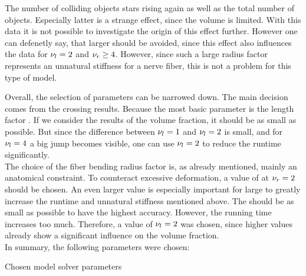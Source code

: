 The number of colliding objects stars rising again as well as the total number of objects.
Especially latter is a strange effect, since the volume is limited.
With this data it is not possible to investigate the origin of this effect further.
However one can defenetly say, that larger \segRadiusFactor{} should be avoided, since this effect also influences the data for $\textnormal{$\nu_{l}$} = 2$ and $\textnormal{$\nu_{r}$} \geq 4$.
However, since such a large radius factor represents an unnatural stiffness for a nerve fiber, this is not a problem for this type of model.
\par
% 
Overall, the selection of parameters can be narrowed down.
The main decision comes from the crossing results.
Because the most basic parameter is the length factor \segLengthFactor{}.
If we consider the results of the volume fraction, it should be as small as possible.
But since the difference between $\textnormal{$\nu_{l}$}=\SI{1}{}$ and $\textnormal{$\nu_{l}$}=\SI{2}{}$ is small, and for $\textnormal{$\nu_{l}$}=\SI{4}{}$ a big jump becomes visible, one can use $\textnormal{$\nu_{l}$}=\SI{2}{}$ to reduce the runtime significantly.
\\
% 
The choice of the fiber bending radius factor \segRadiusFactor{} is, as already mentioned, mainly an anatomical constraint.
To counteract excessive deformation, a value of at $\textnormal{$\nu_{r}$} = \SI{2}{}$ should be chosen.
An even larger value is especially important for large \segLengthFactor{} to greatly increase the runtime and unnatural stiffness mentioned above.
The \segLengthFactor{} should be as small as possible to have the highest accuracy.
However, the running time increases too much.
Therefore, a value of $\textnormal{$\nu_{l}$} = \SI{2}{}$ was chosen, since higher values already show a significant influence on the volume fraction.
\\
% 
In summary, the following parameters were chosen:
% 
\begin{table}[H]
%
\centering
\caption{Chosen model solver parameters}
\label{tab:parameterSetup}
\end{table}

